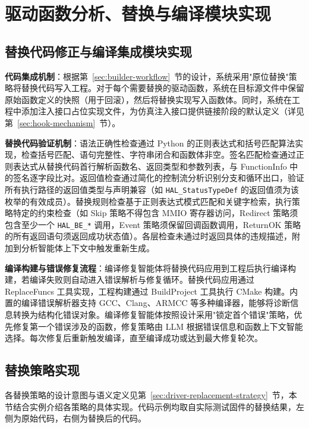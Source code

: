\section{驱动函数分析、替换与编译模块实现}

\subsection{替换代码修正与编译集成模块实现}
\label{sec:builder-fixer-impl}

\textbf{代码集成机制}：根据第~\ref{sec:builder-workflow}~节的设计，系统采用"原位替换"策略将替换代码写入工程。对于每个需要替换的驱动函数，系统在目标源文件中保留原始函数定义的快照（用于回滚），然后将替换实现写入函数体。同时，系统在工程中添加注入接口占位实现文件，为仿真注入接口提供链接阶段的默认定义（详见第~\ref{sec:hook-mechanism}~节）。

\textbf{替换代码验证机制}：语法正确性检查通过 Python 的正则表达式和括号匹配算法实现，检查括号匹配、语句完整性、字符串闭合和函数体非空。签名匹配检查通过正则表达式从替换代码首行解析函数名、返回类型和参数列表，与 FunctionInfo 中的签名逐字段比对。返回值检查通过简化的控制流分析识别分支和循环出口，验证所有执行路径的返回值类型与声明兼容（如 \texttt{HAL\_StatusTypeDef} 的返回值须为该枚举的有效成员）。替换规则检查基于正则表达式模式匹配和关键字检索，执行策略特定的约束检查（如 Skip 策略不得包含 MMIO 寄存器访问，Redirect 策略须包含至少一个 \texttt{HAL\_BE\_*} 调用，Event 策略须保留回调函数调用，ReturnOK 策略的所有返回语句须返回成功状态值）。各层检查未通过时返回具体的违规描述，附加到分析智能体上下文中触发重新生成。

\textbf{编译构建与错误修复流程}：编译修复智能体将替换代码应用到工程后执行编译构建，若编译失败则自动进入错误解析与修复循环。替换代码应用通过 ReplaceFuncs 工具实现，工程构建通过 BuildProject 工具执行 CMake 构建。内置的编译错误解析器支持 GCC、Clang、ARMCC 等多种编译器，能够将诊断信息转换为结构化错误对象。编译修复智能体按照设计采用"锁定首个错误"策略，优先修复第一个错误涉及的函数，修复策略由 LLM 根据错误信息和函数上下文智能选择。每次修复后重新触发编译，直至编译成功或达到最大修复轮次。

\subsection{替换策略实现}

各替换策略的设计意图与语义定义见第~\ref{sec:driver-replacement-strategy}~节，本节结合实例介绍各策略的具体实现。代码示例均取自实际测试固件的替换结果，左侧为原始代码，右侧为替换后的代码。

